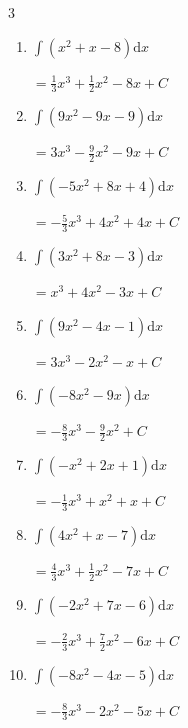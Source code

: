\begin{multicols}{3}
\begin{enumerate}
        $\displaystyle =\frac{7}{3}x^{3}-\frac{5}{2}x^{2}+3x+ C$

\columnbreak %

\resetques

  \item $\displaystyle \int \left( x^{2}+x-8 \right) \mathrm{d}x$

        $\displaystyle =\frac{1}{3}x^{3}+\frac{1}{2}x^{2}-8x+ C$

  \item $\displaystyle \int \left( 9x^{2}-9x-9 \right) \mathrm{d}x$

        $\displaystyle =3x^{3}-\frac{9}{2}x^{2}-9x+ C$

  \item $\displaystyle \int \left( -5x^{2}+8x+4 \right) \mathrm{d}x$

        $\displaystyle =-\frac{5}{3}x^{3}+4x^{2}+4x+ C$

  \item $\displaystyle \int \left( 3x^{2}+8x-3 \right) \mathrm{d}x$

        $\displaystyle =x^{3}+4x^{2}-3x+ C$

  \item $\displaystyle \int \left( 9x^{2}-4x-1 \right) \mathrm{d}x$

        $\displaystyle =3x^{3}-2x^{2}-x+ C$

  \item $\displaystyle \int \left( -8x^{2}-9x \right) \mathrm{d}x$

        $\displaystyle =-\frac{8}{3}x^{3}-\frac{9}{2}x^{2}+ C$

  \item $\displaystyle \int \left( -x^{2}+2x+1 \right) \mathrm{d}x$

        $\displaystyle =-\frac{1}{3}x^{3}+x^{2}+x+ C$

  \item $\displaystyle \int \left( 4x^{2}+x-7 \right) \mathrm{d}x$

        $\displaystyle =\frac{4}{3}x^{3}+\frac{1}{2}x^{2}-7x+ C$

  \item $\displaystyle \int \left( -2x^{2}+7x-6 \right) \mathrm{d}x$

        $\displaystyle =-\frac{2}{3}x^{3}+\frac{7}{2}x^{2}-6x+ C$

  \item $\displaystyle \int \left( -8x^{2}-4x-5 \right) \mathrm{d}x$

        $\displaystyle =-\frac{8}{3}x^{3}-2x^{2}-5x+ C$


\end{enumerate}
\end{multicols}
